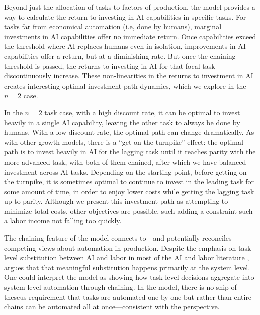 \documentclass{article}
\theoremstyle{plain}
\theoremstyle{plain}
\begin{document}
Beyond just the allocation of tasks to factors of production, the model provides a way to calculate the return to investing in AI capabilities in specific tasks.
For tasks far from economical automation (i.e, done by humans), marginal investments in AI capabilities offer no immediate return.
Once capabilities exceed the threshold where AI replaces humans even in isolation, improvements in AI capabilities offer a return, but at a diminishing rate.
But once the chaining threshold is passed, the returns to investing in AI for that focal task discontinuously increase.
These non-linearities in the returns to investment in AI creates interesting optimal investment path dynamics, which we explore in the $n = 2$ case.

In the $n = 2$ task case, with a high discount rate, it can be optimal to invest heavily in a single AI capability, leaving the other task to always be done by humans.
With a low discount rate, the optimal path can change dramatically. 
As with other growth models, there is a ``get on the turnpike'' effect: the optimal path is to invest heavily in AI for the lagging task until it reaches parity with the more advanced task, with both of them chained, after which we have balanced investment across AI tasks.
Depending on the starting point, before getting on the turnpike, it is sometimes optimal to continue to invest in the leading task for some amount of time, in order to enjoy lower costs while getting the lagging task up to parity.
Although we present this investment path as attempting to minimize total costs, other objectives are possible, such adding a constraint such a labor income not falling too quickly.

The chaining feature of the model connects to---and potentially reconciles---competing views about automation in production. 
Despite the emphasis on task-level substitution between AI and labor in most of the AI and labor literature \citep{autor2003skill, acemoglu2018automation}, \cite{bresnahan2002information} argues that that meaningful substitution happens primarily at the system level. 
One could interpret the model as showing how task-level decisions aggregate into system-level automation through chaining.
In the model, there is no ship-of-theseus requirement that tasks are automated one by one but rather than entire chains can be automated all at once---consistent with the \cite{bresnahan2002information} perspective.
\end{document}
